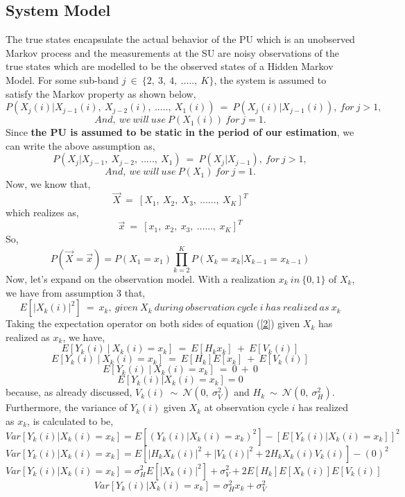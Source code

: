\documentclass[12pt, draftcls, onecolumn]{IEEEtran}
\begin{document}
\subsection{System Model}
The true states encapsulate the actual behavior of the PU which is an unobserved Markov process and the measurements at the SU are noisy observations of the true states which are modelled to be the observed states of a Hidden Markov Model.
For some sub-band $j\ \in\ \{2,\ 3,\ 4,\ .....,\ K\}$, the system is assumed to satisfy the Markov property as shown below,
\[P(X_{j}(i)|X_{j-1}(i),\ X_{j-2}(i),\ .....,\ X_1(i))\ =\ P(X_{j}(i)|X_{j-1}(i)),\ for\ j>1,\]
\[And,\ we\ will\ use\ P(X_1(i))\ for\ j=1.\]
Since \textbf{the PU is assumed to be static in the period of our estimation}, we can write the above assumption as,
\[P(X_{j}|X_{j-1},\ X_{j-2},\ .....,\ X_1)\ =\ P(X_{j}|X_{j-1}),\ for\ j>1,\]
\[And,\ we\ will\ use\ P(X_1)\ for\ j=1.\]
Now, we know that,
\[\vec{X}\ =\ [X_1,\ X_2,\ X_3,\ ......,\ X_K]^T\] which realizes as,
\[\vec{x}\ =\ [x_1,\ x_2,\ x_3,\ ......,\ x_K]^T\]
So,
\begin{equation}\label{4}
    P(\vec{X}=\vec{x}) = P(X_1=x_1) \prod_{k=2}^{K} P(X_k=x_k|X_{k-1}=x_{k-1})
\end{equation}
Now, let's expand on the observation model. With a realization $x_k\ in\ \{0,1\}$ of $X_k$, we have from assumption 3 that,
\[E[|X_k(i)|^2]\ =\ x_k,\ given\ X_k\ during\ observation\ cycle\ i\ has\ realized\ as\ x_k\]
Taking the expectation operator on both sides of equation (\ref{2}) given $X_k$ has realized as $x_k$, we have,
\[E[Y_k(i)\ |\ X_k(i)=x_k]\ =\ E[H_kx_k]\ +\ E[V_k(i)]\]
\[E[Y_k(i)\ |\ X_k(i)=x_k]\ =\ E[H_k]E[x_k]\ +\ E[V_k(i)]\]
\[E[Y_k(i)\ |\ X_k(i)=x_k]\ =\ 0\ +\ 0\]
\begin{equation}\label{5}
    E[Y_k(i) | X_k(i) = x_k] = 0
\end{equation}
because, as already discussed, $V_k(i)\ \sim\ \mathcal{N}(0,\ \sigma_V^2)$ and $H_k\ \sim\ \mathcal{N}(0,\ \sigma_H^2)$.
\\Furthermore, the variance of $Y_k(i)$ given $X_k$ at observation cycle $i$ has realized as $x_k$, is calculated to be, 
\begin{equation*}
    Var[Y_k(i) | X_k(i) = x_k] = E[(Y_k(i) | X_k(i) = x_k)^2] - [E[Y_k(i) | X_k(i) = x_k]]^2
\end{equation*}
\begin{equation*}
    Var[Y_k(i) | X_k(i) = x_k] = E[|H_kX_k(i)|^2 + |V_k(i)|^2 + 2H_kX_k(i)V_k(i)] - (0)^2
\end{equation*}
\begin{equation*}
    Var[Y_k(i) | X_k(i) = x_k] = \sigma_H^2E[|X_k(i)|^2] + \sigma_V^2 + 2E[H_k]E[X_k(i)]E[V_k(i)]
\end{equation*}
\begin{equation}\label{6}
    Var[Y_k(i) | X_k(i) = x_k] = \sigma_H^2x_k + \sigma_V^2
\end{equation}
\end{document}
